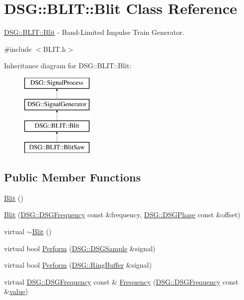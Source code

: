 \hypertarget{class_d_s_g_1_1_b_l_i_t_1_1_blit}{\section{D\+S\+G\+:\+:B\+L\+I\+T\+:\+:Blit Class Reference}
\label{class_d_s_g_1_1_b_l_i_t_1_1_blit}
}


\hyperlink{class_d_s_g_1_1_b_l_i_t_1_1_blit}{D\+S\+G\+::\+B\+L\+I\+T\+::\+Blit} -\/ Band-\/\+Limited Impulse Train Generator.  




{\ttfamily \#include $<$B\+L\+I\+T.\+h$>$}

Inheritance diagram for D\+S\+G\+:\+:B\+L\+I\+T\+:\+:Blit\+:\begin{figure}[H]
\begin{center}
\leavevmode
\includegraphics[height=4.000000cm]{class_d_s_g_1_1_b_l_i_t_1_1_blit}
\end{center}
\end{figure}
\subsection*{Public Member Functions}
\begin{DoxyCompactItemize}
\item 
\hyperlink{class_d_s_g_1_1_b_l_i_t_1_1_blit_a1d9bed6285a8b3c0e073f3e3662716af}{Blit} ()
\item 
\hyperlink{class_d_s_g_1_1_b_l_i_t_1_1_blit_a8ab0fb1b908d641527bb86a81d1722ba}{Blit} (\hyperlink{namespace_d_s_g_a4315a061386fa1014fda09b15d3a6973}{D\+S\+G\+::\+D\+S\+G\+Frequency} const \&frequency, \hyperlink{namespace_d_s_g_a44431ce1eb0a7300efdd207bc879e52c}{D\+S\+G\+::\+D\+S\+G\+Phase} const \&offset)
\item 
virtual \hyperlink{class_d_s_g_1_1_b_l_i_t_1_1_blit_a92da2e1763735b3e17f7b9a24377f988}{$\sim$\+Blit} ()
\item 
virtual bool \hyperlink{class_d_s_g_1_1_b_l_i_t_1_1_blit_adfd7c8891b4c4dbd0530a2780781b2bd}{Perform} (\hyperlink{namespace_d_s_g_ac39a94cd27ebcd9c1e7502d0c624894a}{D\+S\+G\+::\+D\+S\+G\+Sample} \&signal)
\item 
virtual bool \hyperlink{class_d_s_g_1_1_b_l_i_t_1_1_blit_aab7c67ff8f059c8367ba316cf8cd5436}{Perform} (\hyperlink{class_d_s_g_1_1_ring_buffer}{D\+S\+G\+::\+Ring\+Buffer} \&signal)
\item 
virtual \hyperlink{namespace_d_s_g_a4315a061386fa1014fda09b15d3a6973}{D\+S\+G\+::\+D\+S\+G\+Frequency} const \& \hyperlink{class_d_s_g_1_1_b_l_i_t_1_1_blit_a933f8f9f324a4fde4f9e2b69473d88ed}{Frequency} (\hyperlink{namespace_d_s_g_a4315a061386fa1014fda09b15d3a6973}{D\+S\+G\+::\+D\+S\+G\+Frequency} const \&\hyperlink{class_d_s_g_1_1_b_l_i_t_1_1_blit_ac8fb9d4fb45d0697bf364bb5d6b570ce}{value})
\end{DoxyCompactItemize}
